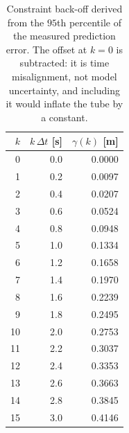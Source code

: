 \begin{table}[htbp]
  \centering
  \small
  \caption{Constraint back-off derived from the $95$th percentile of the measured prediction error. The offset at $k=0$ is subtracted: it is time misalignment, not model uncertainty, and including it would inflate the tube by a constant.}
  \label{res:tab:beta}
  \begin{tabular}{rrr}
    \toprule
    $k$ & $k\,\Delta t$ [s] & $\gamma(k)$ [m] \\
    \midrule
    0 & 0.0 & 0.0000 \\
    1 & 0.2 & 0.0097 \\
    2 & 0.4 & 0.0207 \\
    3 & 0.6 & 0.0524 \\
    4 & 0.8 & 0.0948 \\
    5 & 1.0 & 0.1334 \\
    6 & 1.2 & 0.1658 \\
    7 & 1.4 & 0.1970 \\
    8 & 1.6 & 0.2239 \\
    9 & 1.8 & 0.2495 \\
    10 & 2.0 & 0.2753 \\
    11 & 2.2 & 0.3037 \\
    12 & 2.4 & 0.3353 \\
    13 & 2.6 & 0.3663 \\
    14 & 2.8 & 0.3845 \\
    15 & 3.0 & 0.4146 \\
    \bottomrule
  \end{tabular}
\end{table}

